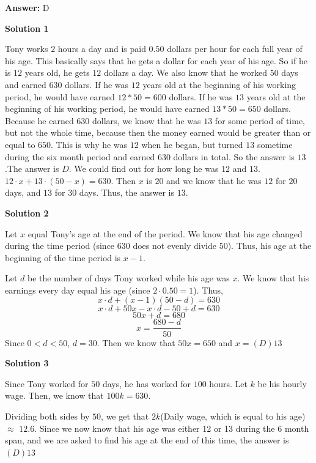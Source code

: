 \begin{enumerate}
 \textbf{Answer: }D



\textbf{Solution 1}

Tony works $2$ hours a day and is paid $0.50$ dollars per hour for each full year of his age. This basically says that he gets a dollar for each year of his age. So if he is $12$ years old, he gets $12$ dollars a day. We also know that he worked $50$ days and earned $630$ dollars. If he was $12$ years old at the beginning of his working period, he would have earned $12 * 50 = 600$ dollars. If he was $13$ years old at the beginning of his working period, he would have earned $13 * 50 = 650$ dollars. Because he earned $630$ dollars, we know that he was $13$ for some period of time, but not the whole time, because then the money earned would be greater than or equal to $650$. This is why he was $12$ when he began, but turned $13$ sometime during the six month period and earned $630$ dollars in total. So the answer is $13$.The answer is $\boxed{D}$. We could find out for how long he was $12$ and $13$. $12 \cdot x + 13 \cdot (50-x) = 630$. Then $x$ is $20$ and we know that he was $12$ for $20$ days, and $13$ for $30$ days. Thus, the answer is $13$.

 



\textbf{Solution 2}

Let $x$ equal Tony's age at the end of the period. We know that his age changed during the time period (since $630$ does not evenly divide $50$). Thus, his age at the beginning of the time period is $x - 1$.

 Let $d$ be the number of days Tony worked while his age was $x$. We know that his earnings every day equal his age (since $2 \cdot 0.50 = 1$). Thus, 
 \[x \cdot d + (x - 1)(50 - d) = 630\] 
 \[x\cdot d + 50x - x\cdot d - 50 + d = 630\] 
 \[50x + d = 680\] 
 \[x = \dfrac{680 - d}{50}\]Since $0 < d <50$, $d = 30$. Then we know that $50x = 650$ and $x = \boxed{(D) 13}$




\textbf{Solution 3}

Since Tony worked for $50$ days, he has worked for $100$ hours. Let $k$ be his hourly wage. Then, we know that $100k = 630$. 

 Dividing both sides by $50$, we get that $2k$(Daily wage, which is equal to his age) $\approx$ $12.6$. Since we now know that his age was either 12 or 13 during the 6 month span, and we are asked to find his age at the end of this time, the answer is $\boxed{(D) 13}$




\end{enumerate}
